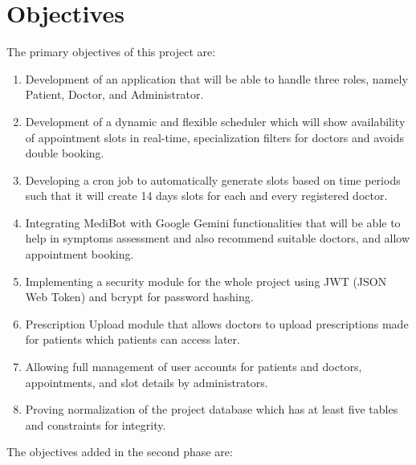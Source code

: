 \FloatBarrier
\section{Objectives}

The primary objectives of this project are:

\begin{enumerate}
    \item Development of an application that will be able to handle three roles, namely Patient, Doctor, and Administrator.
    \item Development of a dynamic and flexible scheduler which will show availability of appointment slots in real-time, specialization filters for doctors and avoids double booking.
    \item Developing a cron job to automatically generate slots based on time periods such that it will create 14 days slots for each and every registered doctor.
    \item Integrating MediBot with Google Gemini functionalities that will be able to help in symptoms assessment and also recommend suitable doctors, and allow appointment booking.
    \item Implementing a security module for the whole project using JWT (JSON Web Token) and bcrypt for password hashing.
    \item Prescription Upload module that allows doctors to upload prescriptions made for patients which patients can access later.
    \item Allowing full management of user accounts for patients and doctors, appointments, and slot details by administrators.
    \item Proving normalization of the project database which has at least five tables and constraints for integrity.
\end{enumerate}

The objectives added in the second phase are:

